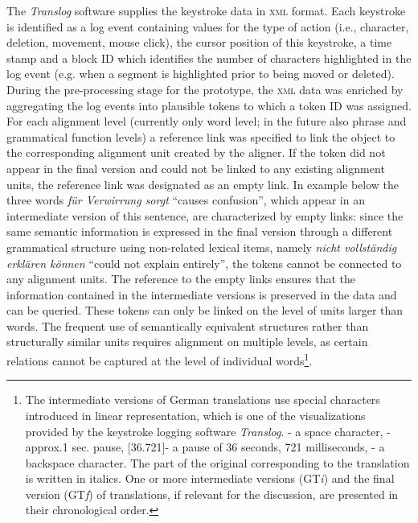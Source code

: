 \documentclass[output=paper]{LSP/langsci}
\begin{document}
The \textit{Translog} software supplies the keystroke data in \textsc{xml} format. Each keystroke is identified as a log event containing values for the type of action (i.e., character, deletion, movement, mouse click), the cursor position of this keystroke, a time stamp and a block ID which identifies the number of characters highlighted in the log event (e.g. when a segment is highlighted prior to being moved or deleted). During the pre-processing stage for the prototype, the \textsc{xml} data was enriched by aggregating the log events into plausible tokens to which a token ID was assigned. For each alignment level (currently only word level; in the future also phrase and grammatical function levels) a reference link was specified to link the object to the corresponding alignment unit created by the aligner. If the token did not appear in the final version and could not be linked to any existing alignment units, the reference link was designated as an empty link. In example  below the three words \textit{für Verwirrung sorgt} “causes confusion”, which appear in an intermediate version of this sentence, are characterized by empty links: since the same semantic information is expressed in the final version through a different grammatical structure using non-related lexical items, namely \textit{nicht vollständig erklären können} “could not explain entirely”, the tokens cannot be connected to any alignment units. The reference to the empty links ensures that the information contained in the intermediate versions is preserved in the data and can be queried. These tokens can only be linked on the level of units larger than words. The frequent use of semantically equivalent structures rather than structurally similar units requires alignment on multiple levels, as certain relations cannot be captured at the level of individual words\footnote{The intermediate versions of German translations use special characters introduced in linear representation, which is one of the visualizations provided by the keystroke logging software \textit{Translog}.  {\raute} - a space character, {\stern} -  approx.1 sec. pause, [{\stern}36.721]- a pause of 36 seconds, 721 milliseconds,{\pfeil} - a backspace character. The part of the original corresponding to the translation is written in italics. One or more intermediate versions (GT\textit{i}) and the final version (GT\textit{f}) of translations, if relevant for the discussion, are presented in their chronological order.}.
\end{document}
